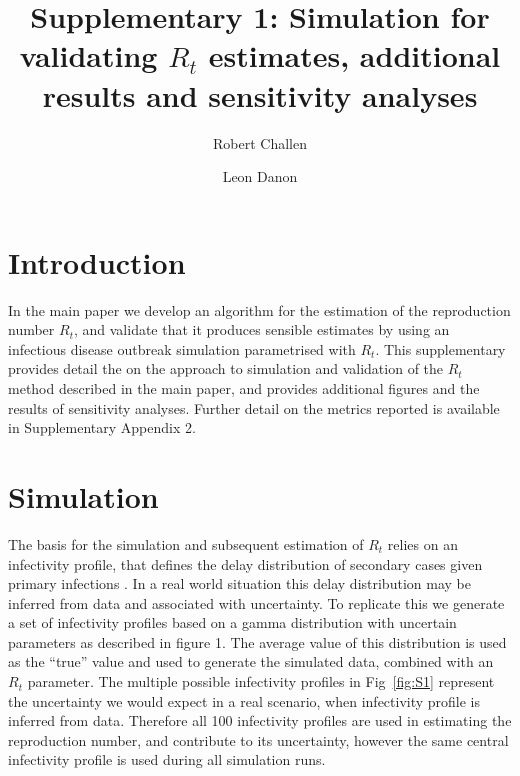 \documentclass[a4paper, 12pt, twoside]{article}
\title{Supplementary 1: Simulation for validating $R_t$ estimates, additional results and sensitivity analyses}
\author[1,2]{Robert Challen}
\author[1,2]{Leon Danon}
\affil[1]{AI4CI, University of Bristol, Bristol, UK.}
\affil[2]{Department of Engineering Mathematics, University of Bristol, Bristol, UK.}
\date{}                     %
\let\Oldsection\section
\renewcommand{\section}{\FloatBarrier\Oldsection}
\begin{document}
\maketitle

\section{Introduction}

In the main paper we develop an algorithm for the estimation of the reproduction number $R_t$, and validate that it produces sensible estimates by using an infectious disease outbreak simulation parametrised with $R_t$. This supplementary provides detail the on the approach to simulation and validation of the $R_t$ method described in the main paper, and provides additional figures and the results of sensitivity analyses. Further detail on the metrics reported is available in Supplementary Appendix 2.

\section{Simulation}

The basis for the simulation and subsequent estimation of $R_t$ relies on an infectivity profile, that defines the delay distribution of secondary cases given primary infections \cite{gostic2020,thompson2019}. In a real world situation this delay distribution may be inferred from data and associated with uncertainty. To replicate this we generate a set of infectivity profiles based on a gamma distribution with uncertain parameters as described in figure 1. The average value of this distribution is used as the ``true'' value and used to generate the simulated data, combined with an $R_t$ parameter. The multiple possible infectivity profiles in Fig~\ref{fig:S1} represent the uncertainty we would expect in a real scenario, when infectivity profile is inferred from data. Therefore all 100 infectivity profiles are used in estimating the reproduction number, and contribute to its uncertainty, however the same central infectivity profile is used during all simulation runs.
\end{document}
